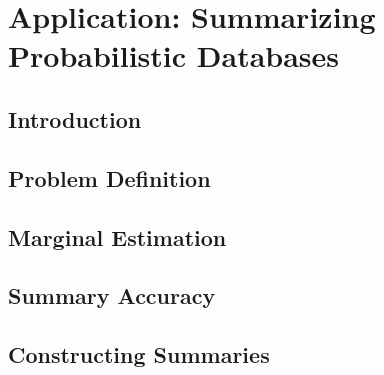 \chapter{Application: Summarizing Probabilistic Databases}
\label{chapter:summarizeprobabilisticdatabases}

\section{Introduction}


\section{Problem Definition}


\section{Marginal Estimation}


\section{Summary Accuracy}


\section{Constructing Summaries}
%

%
